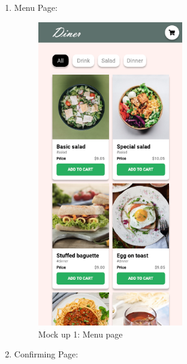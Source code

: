 \documentclass[a4paper,11pt]{extarticle}
\begin{document}
\begin{enumerate}[wide=0pt]
    \item Menu Page:
        \begin{figure}[htbp]
            \centering
            \includegraphics[width=0.6\textwidth]{menu_page.png}
            \caption{Mock up 1: Menu page}
            \label{fig:menu}
        \end{figure}
    \item Confirming Page:
        \begin{figure}[htbp]
            \centering

\end{figure}
\end{enumerate}
\end{document}
